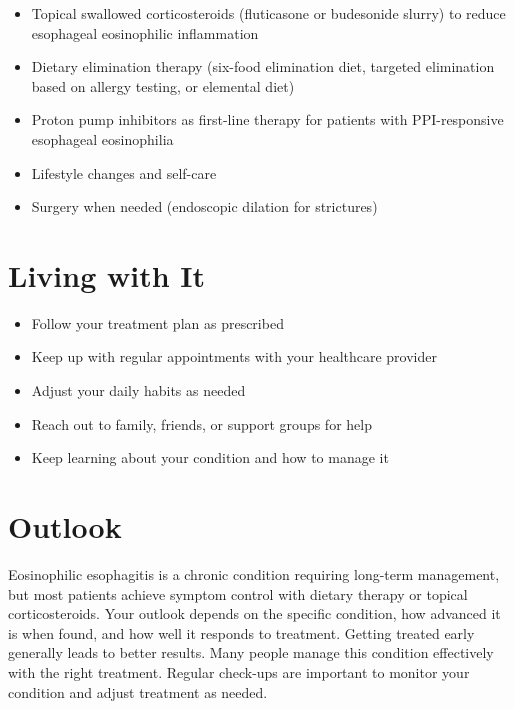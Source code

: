 \begin{itemize}[noitemsep]
  \item Topical swallowed corticosteroids (fluticasone or budesonide slurry) to reduce esophageal eosinophilic inflammation
  \item Dietary elimination therapy (six-food elimination diet, targeted elimination based on allergy testing, or elemental diet)
  \item Proton pump inhibitors as first-line therapy for patients with PPI-responsive esophageal eosinophilia
  \item Lifestyle changes and self-care
  \item Surgery when needed (endoscopic dilation for strictures)
\end{itemize}

\section{Living with It}

\begin{itemize}[noitemsep]
  \item Follow your treatment plan as prescribed
  \item Keep up with regular appointments with your healthcare provider
  \item Adjust your daily habits as needed
  \item Reach out to family, friends, or support groups for help
  \item Keep learning about your condition and how to manage it
\end{itemize}

\section{Outlook}
Eosinophilic esophagitis is a chronic condition requiring long-term management, but most patients achieve symptom control with dietary therapy or topical corticosteroids. Your outlook depends on the specific condition, how advanced it is when found, and how well it responds to treatment. Getting treated early generally leads to better results. Many people manage this condition effectively with the right treatment. Regular check-ups are important to monitor your condition and adjust treatment as needed.
